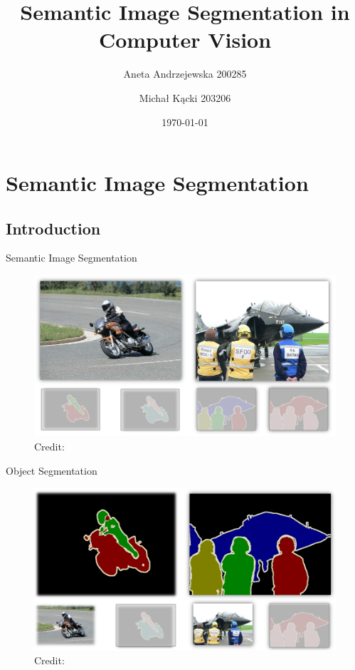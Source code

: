 \documentclass[12]{beamer}
\title[Semantic Image Segmentation in Computer Vision]
{Semantic Image Segmentation in Computer Vision}
\author{Aneta Andrzejewska 200285 \and Michał Kącki 203206}
\date[EngThesisPresentation]{\today}
\begin{document}
\begin{frame}
  \titlepage
\end{frame}



\section{Semantic Image Segmentation}

\subsection{Introduction}

\begin{frame}{Semantic Image Segmentation}

\begin{figure}
\includegraphics[width=\textwidth]{segmentation}
\hspace*{5pt}\hbox{\scriptsize Credit:}
\end{figure}

\end{frame}

\begin{frame}{Object Segmentation}

\begin{figure}
\includegraphics[width=\textwidth]{segmentation_object}
\hspace*{5pt}\hbox{\scriptsize Credit:}
\end{figure}

\end{frame}
\end{document}
